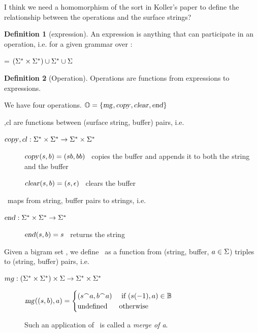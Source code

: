 \documentclass[12pt]{article}
\theoremstyle{definition}
\newtheorem{definition}{Definition}[section]
\begin{document}
  I think we need a homomorphism of the sort in Koller's paper to define the relationship between the operations and the surface strings?

\begin{definition}[expression]
  An expression is anything that can participate in an operation, i.e. for a given grammar over \sg:

  \expr = $(\Sigma^*\times\Sigma^*) \cup \Sigma^* \cup \Sigma$
  
\end{definition}

\begin{definition}[Operation]
  Operations are functions from expressions to expressions.

  We have four operations. $\mathbb{O}=\{\text{\textsl{mg}},\text{\textsl{copy}},\text{\textsl{clear}},\text{\textsl{end}}\}$ 

  \cp,cl are  functions between (surface string, buffer) pairs, i.e.

  $\text{\textsl{copy}},cl : \Sigma^* \times \Sigma^* \rightarrow  \Sigma^* \times \Sigma^*$

  \begin{description}
  \item[\cp] $\text{\textsl{copy}}(s,b) = (sb,bb)$ \hfill \cp~copies the buffer and appends it to both the string and the buffer
  \item[\cl] $\text{\textsl{clear}}(s,b) = (s,\epsilon)$ \hfill \cl~clears the buffer
  \end{description}

  \ed~maps from string, buffer pairs to strings, i.e.

  $\text{\textsl{end}} : \Sigma^* \times \Sigma^* \rightarrow  \Sigma^*$

  \begin{description}
  \item[\ed] $\text{\textsl{end}}(s,b) = s$ \hfill \ed~returns the string
  \end{description}

  Given a bigram set \BIGR, we define \mg~as a function from (string, buffer, $a\in\Sigma$) triples to (string, buffer) pairs, i.e.

  $mg : (\Sigma^* \times \Sigma^*) \times \Sigma \rightarrow  \Sigma^* \times \Sigma^*$


  \begin{description}
  \item[\mg] $\text{\textsl{mg}}((s,b),a) = 
    \begin{cases}
      (s^\frown a, b^\frown a) & \text{ if } (s(-1),a)\in\mathbb{B}\\
      \text{undefined} & \text{otherwise}
    \end{cases}
$

Such an application of \mg~is called a \textit{merge of a}.
  \end{description}

\end{definition}
\end{document}
